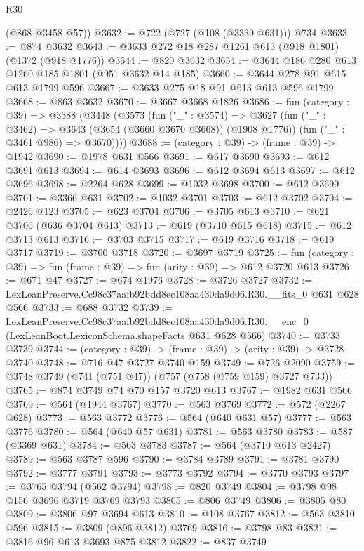 \begin{lexlean}{R30}
\begin{coremodule}
      (@868 @3458 @57))
@3632 := @722 (@727 (@108 (@3339 @631))) @734
@3633 := @874 @3632
@3643 := @3633 @272 @18 @287 @1261 @613 (@918 @1801) (@1372 (@918 @1776))
@3644 := @820 @3632
@3654 := @3644 @186 @280 @613 @1260 @185 @1801 (@951 @3632 @14 @185)
@3660 := @3644 @278 @91 @615 @613 @1799 @596
@3667 := @3633 @275 @18 @91 @613 @613 @596 @1799
@3668 := @863 @3632
@3670 := @3667 @3668 @1826
@3686 := fun (category : @39) =>
  @3388
    (@3448
      (@3573
        (fun ("_" : @3574) =>
        @3627
          (fun ("_" : @3462) => @3643 (@3654 (@3660 @3670 @3668)) (@1908 @1776))
          (fun ("_" : @3461 @986) => @3670))))
@3688 := (category : @39) -> (frame : @39) -> @1942
@3690 := @1978 @631 @566
@3691 := @617 @3690
@3693 := @612 @3691 @613
@3694 := @614 @3693
@3696 := @612 @3694 @613
@3697 := @612 @3696
@3698 := @2264 @628
@3699 := @1032 @3698
@3700 := @612 @3699
@3701 := @3366 @631
@3702 := @1032 @3701
@3703 := @612 @3702
@3704 := @2426 @123
@3705 := @623 @3704
@3706 := @3705 @613
@3710 := @621 @3706 (@636 @3704 @613)
@3713 := @619 (@3710 @615 @618)
@3715 := @612 @3713 @613
@3716 := @3703 @3715
@3717 := @619 @3716
@3718 := @619 @3717
@3719 := @3700 @3718
@3720 := @3697 @3719
@3725 := fun (category : @39) => fun (frame : @39) => fun (arity : @39) => @612 @3720 @613
@3726 := @671 @47
@3727 := @674 @1976
@3728 := @3726 @3727
@3732 := LexLeanPreserve.Cc98c37aafb92bdd8ec108aa430da9d06.R30.__fits_0 @631 @628 @566
@3733 := @688 @3732
@3739 := LexLeanPreserve.Cc98c37aafb92bdd8ec108aa430da9d06.R30.__enc_0
    (LexLeanBoot.LexiconSchema.shapeFacts @631 @628 @566)
@3740 := @3733 @3739
@3744 := (category : @39) -> (frame : @39) -> (arity : @39) -> @3728 @3740
@3748 := @716 @47 @3727 @3740 @159
@3749 := @726 @2090
@3759 := @3748 @3749 (@741 (@751 @47)) (@757 (@758 (@759 @159) @3727 @733))
@3765 := @874 @3749 @74 @70 @157 @3720 @613
@3767 := @1982 @631 @566
@3769 := @564 (@1944 @3767)
@3770 := @563 @3769
@3772 := @572 (@2267 @628)
@3773 := @563 @3772
@3776 := @564 (@640 @631 @57)
@3777 := @563 @3776
@3780 := @564 (@640 @57 @631)
@3781 := @563 @3780
@3783 := @587 (@3369 @631)
@3784 := @563 @3783
@3787 := @564 (@3710 @613 @2427)
@3789 := @563 @3787 @596
@3790 := @3784 @3789
@3791 := @3781 @3790
@3792 := @3777 @3791
@3793 := @3773 @3792
@3794 := @3770 @3793
@3797 := @3765 @3794 (@562 @3794)
@3798 := @820 @3749
@3804 := @3798 @98 @156 @3696 @3719 @3769 @3793
@3805 := @806 @3749
@3806 := @3805 @80
@3809 := @3806 @97 @3694 @613
@3810 := @108 @3767
@3812 := @563 @3810 @596
@3815 := @3809 (@896 @3812) @3769
@3816 := @3798 @83
@3821 := @3816 @96 @613 @3693 @875 @3812
@3822 := @837 @3749

\end{coremodule}
\end{lexlean}
